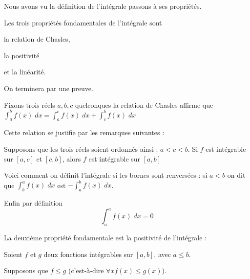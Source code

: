 







\debuttexte

\diapo

\change

Nous avons vu la définition de l'intégrale passons à ses propriétés.

\change

Les trois propriétés fondamentales de l'intégrale sont

la relation de Chasles, 

\change

la positivité 

\change

et la linéarité.

\change

On terminera par une preuve.

\diapo

Fixons trois réels $a,b,c$ quelconques la relation de Chasles
affirme que $\int_a^b f(x)\;dx 
= \int_a^c f(x)\;dx + \int_c^b f(x)\;dx$

\change
Cette relation se justifie par les remarques suivantes :

Supposons que les trois réels soient ordonnés ainsi : $a<c<b$.
Si $f$ est intégrable sur $[a,c]$ et $[c,b]$, alors $f$ est intégrable sur $[a,b]$

\change

Voici comment on définit l'intégrale si les bornes sont renversées :
si $a<b$ on dit que $\int_b^a f(x) \;dx$ est $-\int_a^b f(x) \; dx$.

\change

Enfin par définition 
$$\int_a^a f(x) \;dx=0$$




\diapo

La deuxième propriété fondamentale est la positivité de l'intégrale :

Soient $f$ et $g$ deux fonctions intégrables sur $[a,b]$, avec $a\le b$.

Supposons que $f \le g$ (c'est-à-dire $ \forall x f(x)\le g(x)$).

